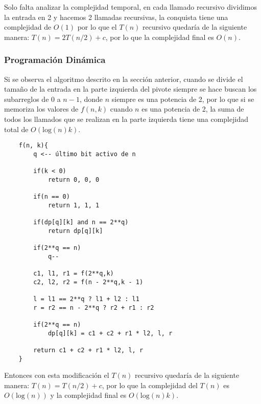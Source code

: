 \documentclass{article}
\begin{document}
Solo falta analizar la complejidad temporal, en cada llamado recursivo dividimos la entrada en 2 y hacemos 2 llamadas recursivas,
la conquista tiene una complejidad de $O(1)$ por lo que el $T(n)$ recursivo quedaría de la siguiente manera: $T(n) = 2T(n/2) + c$,
por lo que la complejidad final es $O(n)$.

\subsubsection{Programación Dinámica}

Si se observa el algoritmo descrito en la sección anterior, cuando se divide el tamaño de la entrada en la parte izquierda del pivote
siempre se hace buscan los subarreglos de 0 a $n-1$, donde $n$ siempre es una potencia de 2, por lo que si se memoriza los valores de
$f(n,k)$ cuando $n$ es una potencia de 2, la suma de todos los llamados que se realizan en la parte izquierda tiene una complejidad total
de $O(\text{log}(n)k)$.

\begin{verbatim}
    f(n, k){
        q <-- último bit activo de n 

        if(k < 0)
            return 0, 0, 0

        if(n == 0)
            return 1, 1, 1

        if(dp[q][k] and n == 2**q)
            return dp[q][k]

        if(2**q == n) 
            q--

        c1, l1, r1 = f(2**q,k)
        c2, l2, r2 = f(n - 2**q,k - 1)

        l = l1 == 2**q ? l1 + l2 : l1
        r = r2 == n - 2**q ? r2 + r1 : r2

        if(2**q == n)
            dp[q][k] = c1 + c2 + r1 * l2, l, r  
        
        return c1 + c2 + r1 * l2, l, r 
    }
\end{verbatim}

Entonces con esta modificación el $T(n)$ recursivo quedaría de la siguiente manera: $T(n) = T(n/2) + c$,
por lo que la complejidad del $T(n)$ es $O(\text{log}(n))$ y la complejidad final es $O(\text{log}(n)k)$.
\end{document}
